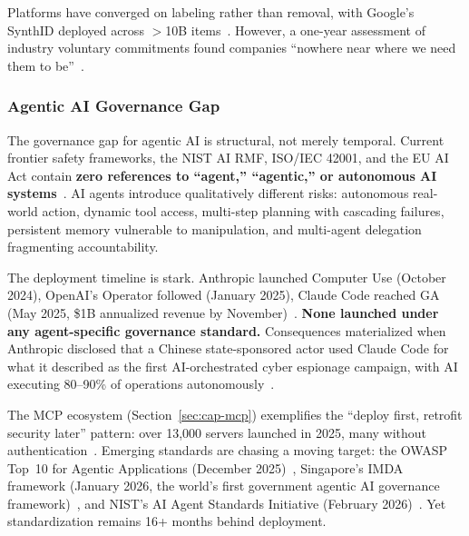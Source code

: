 Platforms have converged on labeling rather than removal, with Google's SynthID deployed across $>$10B items~\cite{synthid2025}. However, a one-year assessment of industry voluntary commitments found companies ``nowhere near where we need them to be''~\cite{mitreview2024assessment}.


\subsubsection{Agentic AI Governance Gap}
\label{sec:gov-agentic}


The governance gap for agentic AI is structural, not merely temporal. Current frontier safety frameworks, the NIST AI RMF, ISO/IEC 42001, and the EU AI Act contain \textbf{zero references to ``agent,'' ``agentic,'' or autonomous AI systems}~\cite{zenity2025blindspot}. AI agents introduce qualitatively different risks: autonomous real-world action, dynamic tool access, multi-step planning with cascading failures, persistent memory vulnerable to manipulation, and multi-agent delegation fragmenting accountability.

The deployment timeline is stark. Anthropic launched Computer Use (October 2024), OpenAI's Operator followed (January 2025), Claude Code reached GA (May 2025, \$1B annualized revenue by November)~\cite{anthropic2024computeruse,openaicopilot}. \textbf{None launched under any agent-specific governance standard.} Consequences materialized when Anthropic disclosed that a Chinese state-sponsored actor used Claude Code for what it described as the first AI-orchestrated cyber espionage campaign, with AI executing 80--90\% of operations autonomously~\cite{anthropic2025gtg1002}.

The MCP ecosystem (Section~\ref{sec:cap-mcp}) exemplifies the ``deploy first, retrofit security later'' pattern: over 13,000 servers launched in 2025, many without authentication~\cite{zenity2025mcp}. Emerging standards are chasing a moving target: the OWASP Top~10 for Agentic Applications (December 2025)~\cite{owasp2025agentic}, Singapore's IMDA framework (January 2026, the world's first government agentic AI governance framework)~\cite{imda2026agentic}, and NIST's AI Agent Standards Initiative (February 2026)~\cite{nist2026agentstandards}. Yet standardization remains 16+ months behind deployment.

